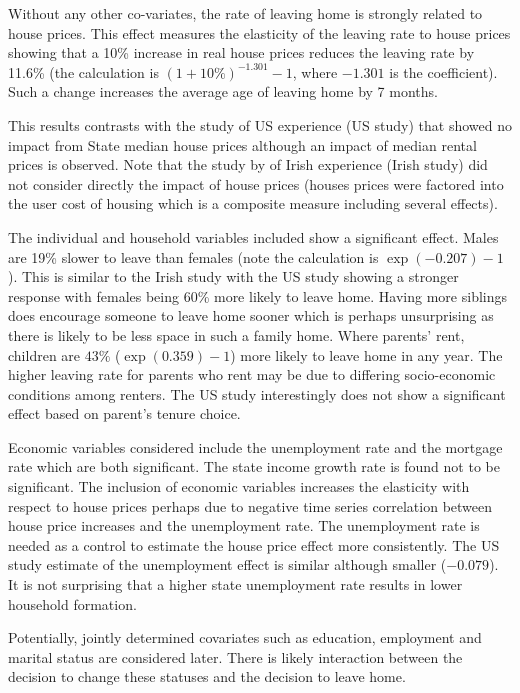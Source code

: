 \documentclass[12pt]{article}
\begin{document}
Without any other co-variates, the rate of leaving home is strongly related to house prices. This effect measures the elasticity of the leaving rate to house prices showing that a 10\% increase in real house prices reduces the leaving rate by 11.6\% (the calculation is $(1+10\%)^{-1.301} - 1$, where $-1.301$ is the coefficient). Such a change increases the average age of leaving home by 7 months.

This results contrasts with the \cite{lee2013happens} study of US experience (US study) that showed no impact from State median house prices although an impact of median rental prices is observed. Note that the study by \cite{byrne2014household} of Irish experience (Irish study) did not consider directly the impact of house prices (houses prices were factored into the user cost of housing which is a composite measure including several effects).

The individual and household variables included show a significant effect. Males are 19\% slower to leave than females (note the calculation is $\exp(-0.207)-1$). This is similar to the Irish study with the US study showing a  stronger response with females being 60\% more likely to leave home. Having more siblings does encourage someone to leave home sooner which is perhaps unsurprising as there is likely to be less space in such a family home. Where parents' rent, children are $43\%$ ($\exp(0.359)-1$) more likely to leave home in any year. The higher leaving rate for parents who rent may be due to differing socio-economic conditions among renters. The US study interestingly does not show a significant effect based on parent's tenure choice.

Economic variables considered include the unemployment rate and the mortgage rate which are both significant. The state income growth rate is found not to be significant. The inclusion of economic variables increases the elasticity with respect to house prices perhaps due to negative time series correlation between house price increases and the unemployment rate. The unemployment rate is needed as a control to estimate the house price effect more consistently.  The US study estimate of the unemployment effect is similar although smaller ($-0.079$). It is not surprising that a higher state unemployment rate results in lower household formation.

Potentially, jointly determined covariates such as education, employment and marital status are considered later. There is likely interaction between the decision to change these statuses and the decision to leave home.
\end{document}
